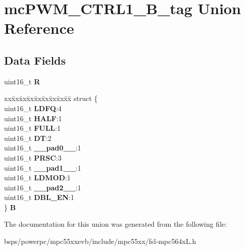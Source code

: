 \hypertarget{unionmcPWM__CTRL1__16B__tag}{}\section{mc\+P\+W\+M\+\_\+\+C\+T\+R\+L1\+\_\+B\+\_\+tag Union Reference}
\label{unionmcPWM__CTRL1__16B__tag}
\subsection*{Data Fields}
\begin{DoxyCompactItemize}
\item 
\mbox{\label{unionmcPWM__CTRL1__16B__tag_a085136e87313250a33be0b5ac9eca788}} 
uint16\+\_\+t {\bfseries R}
\item 
\mbox{\label{unionmcPWM__CTRL1__16B__tag_ad2b4b1694c5677795b786aaa4ad47edc}} 
\begin{tabbing}
xx\=xx\=xx\=xx\=xx\=xx\=xx\=xx\=xx\=\kill
struct \{\\
\>uint16\_t {\bfseries LDFQ}:4\\
\>uint16\_t {\bfseries HALF}:1\\
\>uint16\_t {\bfseries FULL}:1\\
\>uint16\_t {\bfseries DT}:2\\
\>uint16\_t {\bfseries \_\_pad0\_\_}:1\\
\>uint16\_t {\bfseries PRSC}:3\\
\>uint16\_t {\bfseries \_\_pad1\_\_}:1\\
\>uint16\_t {\bfseries LDMOD}:1\\
\>uint16\_t {\bfseries \_\_pad2\_\_}:1\\
\>uint16\_t {\bfseries DBL\_EN}:1\\
\} {\bfseries B}\\

\end{tabbing}\end{DoxyCompactItemize}


The documentation for this union was generated from the following file\+:\begin{DoxyCompactItemize}
\item 
bsps/powerpc/mpc55xxevb/include/mpc55xx/fsl-\/mpc564x\+L.\+h\end{DoxyCompactItemize}
